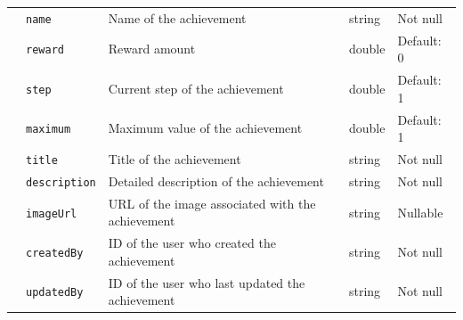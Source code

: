 \begin{landscape}
\begin{longtable}{ | m{} | m{} | m{} | m{} | m{} | }
        \cline{2-5}
                                                                         & \texttt{name}                             & Name of the achievement                                              & string        & Not null                      \\
        \cline{2-5}
                                                                         & \texttt{reward}                           & Reward amount                                                        & double        & Default: 0                    \\
        \cline{2-5}
                                                                         & \texttt{step}                             & Current step of the achievement                                      & double        & Default: 1                    \\
        \cline{2-5}
                                                                         & \texttt{maximum}                          & Maximum value of the achievement                                     & double        & Default: 1                    \\
        \cline{2-5}
                                                                         & \texttt{title}                            & Title of the achievement                                             & string        & Not null                      \\
        \cline{2-5}
                                                                         & \texttt{description}                      & Detailed description of the achievement                              & string        & Not null                      \\
        \cline{2-5}
                                                                         & \texttt{imageUrl}                         & URL of the image associated with the achievement                     & string        & Nullable                      \\
        \cline{2-5}
                                                                         & \texttt{createdBy}                        & ID of the user who created the achievement                           & string        & Not null                      \\
        \cline{2-5}
                                                                         & \texttt{updatedBy}                        & ID of the user who last updated the achievement                      & string        & Not null                      \\

\end{longtable}
\end{landscape}
